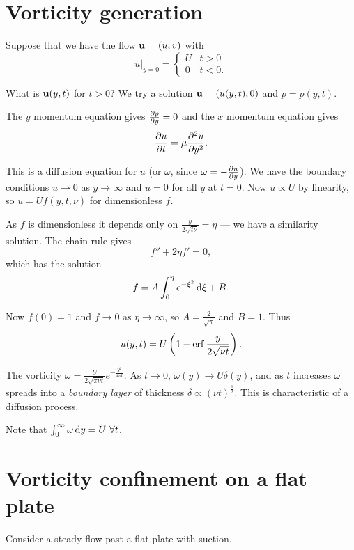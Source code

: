 \documentclass{notes}
\theoremstyle{plain}
\begin{document}
\section{Vorticity generation}

\vspace{1in}

Suppose that we have the flow $\mathbf{u} = (u,v)$ with
\[
\left.u\right|_{y = 0} = \begin{cases} U & t > 0 \\ 0 & t < 0.\end{cases}
\]

What is $\mathbf{u}(y,t)$ for $t > 0$?  We try a solution
$\mathbf{u} = (u(y,t),0)$ and $p = p(y,t)$.

The $y$ momentum equation gives $\frac{\partial p}{\partial y} = 0$ and the $x$ momentum equation
gives
\[
\frac{\partial u}{\partial t} = \mu \frac{\partial ^2 u}{\partial y^2}.
\]

This is a diffusion equation for $u$ (or $\omega$, since
$\omega = -\frac{\partial u}{\partial y}$).  We have the boundary conditions
$u \to 0$ as $y \to \infty$ and $u = 0$ for all $y$ at $t = 0$.  Now
$u \propto U$ by linearity, so $u = U f(y,t,\nu)$ for dimensionless $f$.

As $f$ is dimensionless it depends only on $\frac{y}{2 \sqrt{t \nu}}
= \eta$ --- we have a similarity solution.  The chain rule gives
\[
f'' + 2 \eta f' = 0,
\]
which has the solution
\[
f = A \int_0^\eta e^{-\xi^2}\, \mathrm{d} \xi + B.
\]

Now $f(0) = 1$ and $f \to 0$ as $\eta \to \infty$, so $A =
\frac{2}{\sqrt{\pi}}$ and $B = 1$.  Thus
\[
u(y,t) = U \left( 1 - \operatorname{erf} \frac{y}{2 \sqrt{\nu t}} \right).
\]

The vorticity $\omega = \frac{U}{2 \sqrt{\pi \nu t}} e^{-\frac{y^2}{4 \nu t}}$.
As $t \to 0$, $\omega(y) \to U \delta(y)$, and as $t$ increases
$\omega$ spreads into a \emph{boundary layer} of thickness $\delta \propto
\left( \nu t \right)^{\frac{1}{2}}$.  This is characteristic of a diffusion
process.

\vspace{1in}

Note that $\int_0^\infty \omega\, \mathrm{d} y = U\ \forall t$.

\section{Vorticity confinement on a flat plate}

Consider a steady flow past a flat plate with suction.

\vspace{1in}
\end{document}
